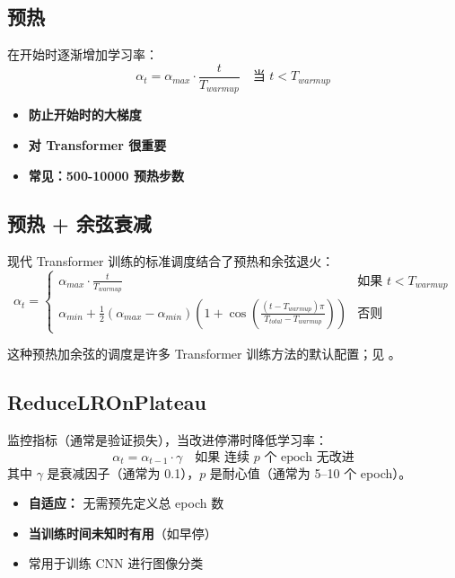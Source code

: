 \subsection{预热}

在开始时逐渐增加学习率：
\begin{equation}
\alpha_t = \alpha_{max} \cdot \frac{t}{T_{warmup}} \quad \text{当 } t < T_{warmup}
\end{equation}

\begin{itemize}
    \item \textbf{防止开始时的大梯度}
    \item \textbf{对 Transformer 很重要}
    \item \textbf{常见：500-10000 预热步数}
\end{itemize}

\subsection{预热 + 余弦衰减}

现代 Transformer 训练的标准调度结合了预热和余弦退火：
\begin{equation}
\alpha_t = \begin{cases}
\alpha_{max} \cdot \frac{t}{T_{warmup}} & \text{如果 } t < T_{warmup} \\
\alpha_{min} + \frac{1}{2}(\alpha_{max} - \alpha_{min})\left(1 + \cos\left(\frac{(t - T_{warmup})\pi}{T_{total} - T_{warmup}}\right)\right) & \text{否则}
\end{cases}
\end{equation}

这种预热加余弦的调度是许多 Transformer 训练方法的默认配置；见 \cite{loshchilov2016sgdr,goyal2017accurate}。

\subsection{ReduceLROnPlateau}

监控指标（通常是验证损失），当改进停滞时降低学习率：
\begin{equation}
\alpha_t = \alpha_{t-1} \cdot \gamma \quad \text{如果 } \text{连续 } p \text{ 个 epoch 无改进}
\end{equation}
其中 $\gamma$ 是衰减因子（通常为 0.1），$p$ 是耐心值（通常为 5--10 个 epoch）。

\begin{itemize}
    \item \textbf{自适应：} 无需预先定义总 epoch 数
    \item \textbf{当训练时间未知时有用}（如早停）
    \item 常用于训练 CNN 进行图像分类
\end{itemize}

